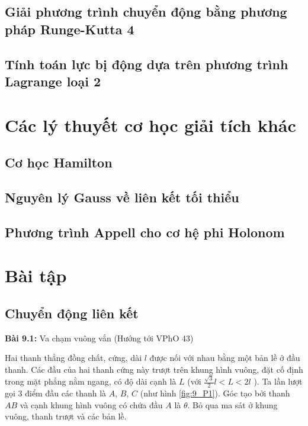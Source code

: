 

\subsection{Giải phương trình chuyển động bằng phương pháp Runge-Kutta 4}

\subsection{Tính toán lực bị động dựa trên phương trình Lagrange loại 2}

\section{Các lý thuyết cơ học giải tích khác}

\subsection{Cơ học Hamilton}

\subsection{Nguyên lý Gauss về liên kết tối thiểu}

\subsection{Phương trình Appell cho cơ hệ phi Holonom}


\section{Bài tập}

\subsection*{Chuyển động liên kết}

\textbf{Bài 9.1:} Va chạm vuông vắn (Hướng tới VPhO 43)

Hai thanh thẳng đồng chất, cứng, dài \(l\) được nối với nhau bằng một bản lề ở đầu thanh. 
Các đầu của hai thanh cứng này trượt trên khung hình vuông, đặt cố định trong mặt phẳng nằm ngang, có độ dài cạnh là \(L\) (với \(\frac{\sqrt{3}}{2}l<L<2l\) ). 
Ta lần lượt gọi 3 điểm đầu các thanh là \(A\), \(B\), \(C\) (như hình \ref{fig:9_P1}). Góc tạo bởi thanh \(AB\) và cạnh khung hình vuông có chứa đầu \(A\) là \(\theta\). Bỏ qua ma sát ở khung vuông, thanh trượt và các bản lề.


